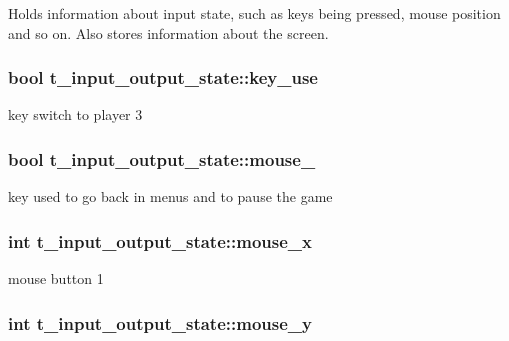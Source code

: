 Holds information about input state, such as keys being pressed, mouse position and so on. Also stores information about the screen. \hypertarget{structt__input__output__state_a30f2ccfec5fdb7c45df57d02a9967845}{
\subsubsection[{key\-\_\-use}]{\setlength{\rightskip}{0pt plus 5cm}bool t\-\_\-input\-\_\-output\-\_\-state\-::key\-\_\-use}}\label{structt__input__output__state_a30f2ccfec5fdb7c45df57d02a9967845}
key switch to player 3 \hypertarget{structt__input__output__state_a5d93aef9032f6da00cc274bf4062f302}{
\subsubsection[{mouse\-\_\-1}]{\setlength{\rightskip}{0pt plus 5cm}bool t\-\_\-input\-\_\-output\-\_\-state\-::mouse\-\_}}\label{structt__input__output__state_a5d93aef9032f6da00cc274bf4062f302}
key used to go back in menus and to pause the game \hypertarget{structt__input__output__state_ade192d11582991da2533029506ad959e}{
\subsubsection[{mouse\-\_\-x}]{\setlength{\rightskip}{0pt plus 5cm}int t\-\_\-input\-\_\-output\-\_\-state\-::mouse\-\_\-x}}\label{structt__input__output__state_ade192d11582991da2533029506ad959e}
mouse button 1 \hypertarget{structt__input__output__state_aa9680f3841a1f09512cbfbfd961b8886}{
\subsubsection[{mouse\-\_\-y}]{\setlength{\rightskip}{0pt plus 5cm}int t\-\_\-input\-\_\-output\-\_\-state\-::mouse\-\_\-y}}\label{structt__input__output__state_aa9680f3841a1f09512cbfbfd961b8886}
